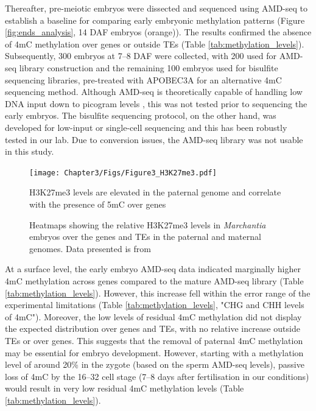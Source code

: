 Thereafter, pre-meiotic embryos were dissected and sequenced using AMD-seq to establish a baseline for comparing early embryonic methylation patterns (Figure \ref{fig:ends_analysis}, 14 DAF embryos (orange)). The results confirmed the absence of 4mC methylation over genes or outside TEs (Table \ref{tab:methylation_levels}). Subsequently, 300 embryos at 7–8 DAF were collected, with 200 used for AMD-seq library construction and the remaining 100 embryos used for bisulfite sequencing libraries, pre-treated with APOBEC3A for an alternative 4mC sequencing method. Although AMD-seq is theoretically capable of handling low DNA input down to picogram levels \cite{idtdna_methylseq_kit}, this was not tested prior to sequencing the early embryos. The bisulfite sequencing protocol, on the other hand, was developed for low-input or single-cell sequencing and this has been robustly tested in our lab. Due to conversion issues, the AMD-seq library was not usable in this study. 

\begin{figure}[htbp!] 
\centering    
    \texttt{[image: Chapter3/Figs/Figure3\_H3K27me3.pdf]}
\caption{H3K27me3 levels are elevated in the paternal genome and correlate with the presence of 5mC over genes}
\label{fig:h3k27me3}
\captionsetup{font=small}
    \caption*{Heatmaps showing the relative H3K27me3 levels in \textit{Marchantia} embryos over the genes and TEs in the paternal and maternal genomes. Data presented is from \cite{RN160}}
\end{figure}

At a surface level, the early embryo AMD-seq data indicated marginally higher 4mC methylation across genes compared to the mature AMD-seq library (Table \ref{tab:methylation_levels}). However, this increase fell within the error range of the experimental limitations (Table \ref{tab:methylation_levels}, "CHG and CHH levels of 4mC"). Moreover, the low levels of residual 4mC methylation did not display the expected distribution over genes and TEs, with no relative increase outside TEs or over genes. This suggests that the removal of paternal 4mC methylation may be essential for embryo development. However, starting with a methylation level of around 20\% in the zygote (based on the sperm AMD-seq levels), passive loss of 4mC by the 16–32 cell stage (7–8 days after fertilisation in our conditions) would result in very low residual 4mC methylation levels (Table \ref{tab:methylation_levels}). 

